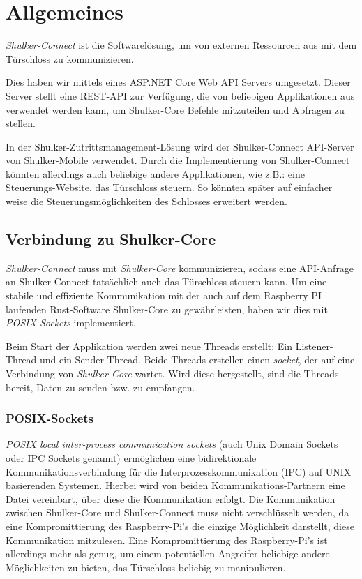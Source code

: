 \lstset{language=[Sharp]C}
\chapter{Allgemeines}
\textit{Shulker-Connect} ist die Softwarelösung, um von externen Ressourcen aus mit dem Türschloss zu kommunizieren.

Dies haben wir mittels eines ASP.NET Core Web API Servers umgesetzt. Dieser Server stellt eine REST-API zur Verfügung, 
die von beliebigen Applikationen aus verwendet werden kann, um Shulker-Core Befehle mitzuteilen und Abfragen zu stellen.

In der Shulker-Zutrittsmanagement-Lösung wird der Shulker-Connect API-Server von Shulker-Mobile verwendet. 
Durch die Implementierung von Shulker-Connect könnten allerdings auch beliebige andere Applikationen, 
wie z.B.: eine Steuerungs-Website, das Türschloss steuern. 
So könnten später auf einfacher weise die Steuerungsmöglichkeiten des Schlosses erweitert werden.

\section{Verbindung zu Shulker-Core}
\textit{Shulker-Connect} muss mit \textit{Shulker-Core} kommunizieren, sodass eine API-Anfrage an Shulker-Connect tatsächlich
auch das Türschloss steuern kann.
Um eine stabile und effiziente Kommunikation mit der auch auf dem Raspberry PI laufenden Rust-Software Shulker-Core zu 
gewährleisten, haben wir dies mit \textit{POSIX-Sockets} implementiert.

Beim Start der Applikation werden zwei neue Threads erstellt: Ein Listener-Thread und ein Sender-Thread.
Beide Threads erstellen einen \textit{socket}, der auf eine Verbindung von \textit{Shulker-Core} wartet.
Wird diese hergestellt, sind die Threads bereit, Daten zu senden bzw. zu empfangen. 

\subsection{POSIX-Sockets}
\textit{POSIX local inter-process communication sockets} (auch Unix Domain Sockets oder IPC Sockets genannt) ermöglichen
eine bidirektionale Kommunikationsverbindung für die Interprozesskommunikation (IPC) auf UNIX basierenden Systemen.
Hierbei wird von beiden Kommunikations-Partnern eine Datei vereinbart, über diese die Kommunikation erfolgt. \cite{ipcsockets}
Die Kommunikation zwischen Shulker-Core und Shulker-Connect muss nicht verschlüsselt werden, da eine Kompromittierung des
Raspberry-Pi's die einzige Möglichkeit darstellt, diese Kommunikation mitzulesen. Eine Kompromittierung des Raspberry-Pi's
ist allerdings mehr als genug, um einem potentiellen Angreifer beliebige andere Möglichkeiten zu bieten, das Türschloss
beliebig zu manipulieren.

